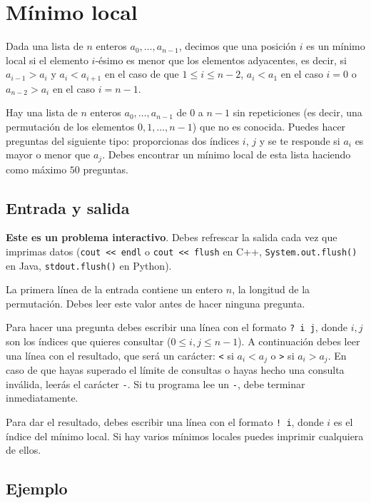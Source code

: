 \documentclass[10.5pt]{article}
\begin{document}
\section*{M\'inimo local}

Dada una lista de $n$ enteros $a_0, \ldots, a_{n-1}$, decimos que una posici\'on $i$ es un m\'inimo local si el elemento $i$-\'esimo es menor que los elementos adyacentes, es decir,  si $a_{i-1} > a_i$ y $a_i < a_{i+1}$ en el caso de que $1 \leq i \leq n-2$, $a_i < a_1$ en el caso $i = 0$ o $a_{n-2} > a_i$ en el caso $i = n-1$. 

Hay una lista de $n$ enteros $a_0, \ldots, a_{n-1}$ de $0$ a $n-1$ sin repeticiones (es decir, una permutaci\'on de los elementos $0, 1, \ldots, n-1$) que no es conocida. Puedes hacer preguntas del siguiente tipo: proporcionas dos \'indices $i$, $j$ y se te responde si $a_i$ es mayor o menor que $a_j$. Debes encontrar un m\'inimo local de esta lista haciendo como m\'aximo $50$ preguntas.



\subsection*{Entrada y salida}

\textbf{Este es un problema interactivo}. Debes refrescar la salida cada vez que imprimas datos (\texttt{cout << endl} o \texttt{cout << flush} en C++, \texttt{System.out.flush()} en Java, \texttt{stdout.flush()} en Python).

La primera l\'inea de la entrada contiene un entero $n$, la longitud de la permutaci\'on. Debes leer este valor antes de hacer ninguna pregunta.

Para hacer una pregunta debes escribir una l\'inea con el formato \verb#? i j#, donde $i, j$ son los \'indices que quieres consultar ($0 \leq i, j \leq n-1$). A continuaci\'on debes leer una l\'inea con el resultado, que ser\'a un car\'acter: \verb#<# si $a_i < a_j$ o \verb#># si $a_i > a_j$. En caso de que hayas superado el l\'imite de consultas o hayas hecho una consulta inv\'alida, leer\'as el car\'acter \verb#-#. Si tu programa lee un \verb#-#, debe terminar inmediatamente.

Para dar el resultado, debes escribir una l\'inea con el formato \verb#! i#, donde $i$ es el \'indice del m\'inimo local. Si hay varios m\'inimos locales puedes imprimir cualquiera de ellos.



\subsection*{Ejemplo}
\end{document}
